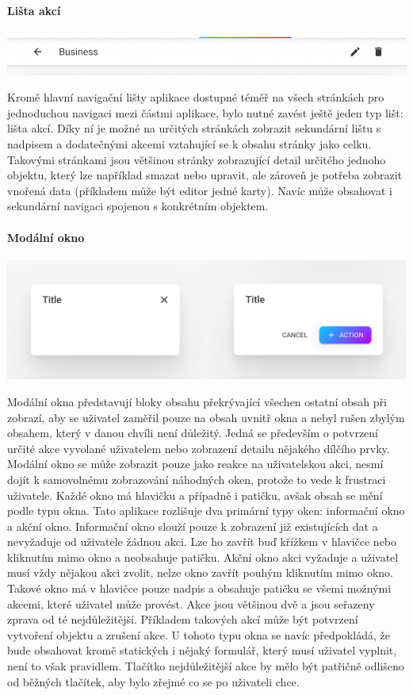 			\paragraph{Lišta akcí}

			\includegraphics[width=0.24\linewidth]{obrazky/lista_akci.png}\hfill

			Kromě hlavní navigační lišty aplikace dostupné téměř na všech stránkách pro jednoduchou navigaci mezi
			částmi aplikace, bylo nutné zavést ještě jeden typ lišt: lišta akcí.
			Díky ní je možné na určitých stránkách zobrazit sekundární lištu s nadpisem a dodatečnými akcemi vztahující
			se k obsahu stránky jako celku.
			Takovými stránkami jsou většinou stránky zobrazující detail určitého jednoho objektu, který lze například
			smazat nebo upravit, ale zároveň je potřeba zobrazit vnořená data (příkladem může být editor jedné karty).
			Navíc může obsahovat i sekundární navigaci spojenou s konkrétním objektem.

			\paragraph{Modální okno}

			\includegraphics[width=0.24\linewidth]{obrazky/modalni_okno.png}\hfill

			Modální okna představují bloky obsahu překrývající všechen ostatní obsah při zobrazí, aby se uživatel zaměřil
			pouze na obsah uvnitř okna a nebyl rušen zbylým obsahem, který v danou chvíli není důležitý.
			Jedná se především o potvrzení určité akce vyvolané uživatelem nebo zobrazení detailu nějakého dílčího prvky.
			Modální okno se může zobrazit pouze jako reakce na uživatelskou akci, nesmí dojít k samovolnému zobrazování
			náhodných oken, protože to vede k frustraci uživatele.
			Každé okno má hlavičku a případně i patičku, avšak obsah se mění podle typu okna.
			Tato aplikace rozlišuje dva primární typy oken: informační okno a akční okno.
			Informační okno slouží pouze k zobrazení již existujících dat a nevyžaduje od uživatele žádnou akci.
			Lze ho zavřít buď křížkem v hlavičce nebo kliknutím mimo okno a neobsahuje patičku.
			Akční okno akci vyžaduje a uživatel musí vždy nějakou akci zvolit, nelze okno zavřít pouhým kliknutím mimo okno.
			Takové okno má v hlavičce pouze nadpis a obsahuje patičku se všemi možnými akcemi, které uživatel může provést.
			Akce jsou většinou dvě a jsou seřazeny zprava od té nejdůležitější.
			Příkladem takových akcí může být potvrzení vytvoření objektu a zrušení akce.
			U tohoto typu okna se navíc předpokládá, že bude obsahovat kromě statických i nějaký formulář, který musí
			uživatel vyplnit, není to však pravidlem.
			Tlačítko nejdůležitější akce by mělo být patřičně odlišeno od běžných tlačítek, aby bylo zřejmé co se po
			uživateli chce.

